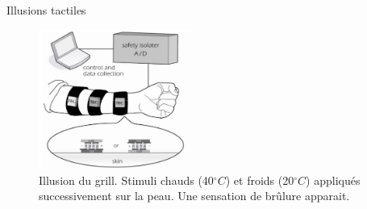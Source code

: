 {
\begin{frame}{Illusions tactiles}
\begin{figure}
\centering
\includegraphics[width=5cm]{images/thermalgrill}
\caption{Illusion du grill. Stimuli chauds (40$^{\circ}C$) et froids (20$^{\circ}C$) appliqués successivement sur la peau. Une sensation de brûlure apparait.}
\end{figure}
\end{frame}
}

